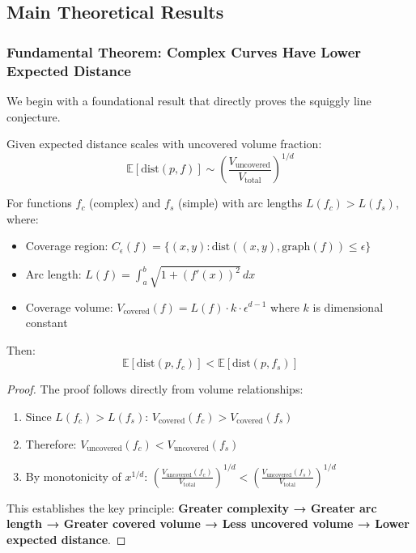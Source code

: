 \subsection{Main Theoretical Results}

\subsubsection{Fundamental Theorem: Complex Curves Have Lower Expected Distance}

We begin with a foundational result that directly proves the squiggly line conjecture.

\begin{theorem}
\label{thm:complex-curves}
Given expected distance scales with uncovered volume fraction:
$$\mathbb{E}[\text{dist}(p, f)] \sim \left(\frac{V_{\text{uncovered}}}{V_{\text{total}}}\right)^{1/d}$$

For functions $f_c$ (complex) and $f_s$ (simple) with arc lengths $L(f_c) > L(f_s)$, where:
\begin{itemize}
    \item Coverage region: $C_\epsilon(f) = \{(x,y) : \text{dist}((x,y), \text{graph}(f)) \leq \epsilon\}$
    \item Arc length: $L(f) = \int_a^b \sqrt{1 + (f'(x))^2} \, dx$
    \item Coverage volume: $V_{\text{covered}}(f) = L(f) \cdot k \cdot \epsilon^{d-1}$ where $k$ is dimensional constant
\end{itemize}

Then:
$$\boxed{\mathbb{E}[\text{dist}(p, f_c)] < \mathbb{E}[\text{dist}(p, f_s)]}$$
\end{theorem}

\begin{proof}
The proof follows directly from volume relationships:
\begin{enumerate}
    \item Since $L(f_c) > L(f_s)$: $V_{\text{covered}}(f_c) > V_{\text{covered}}(f_s)$
    \item Therefore: $V_{\text{uncovered}}(f_c) < V_{\text{uncovered}}(f_s)$ 
    \item By monotonicity of $x^{1/d}$: $\left(\frac{V_{\text{uncovered}}(f_c)}{V_{\text{total}}}\right)^{1/d} < \left(\frac{V_{\text{uncovered}}(f_s)}{V_{\text{total}}}\right)^{1/d}$
\end{enumerate}
This establishes the key principle: \textbf{Greater complexity → Greater arc length → Greater covered volume → Less uncovered volume → Lower expected distance}.
\end{proof}

